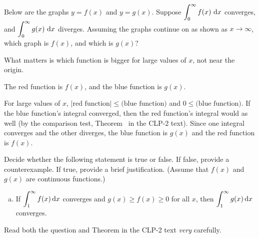 \begin{Mquestion}
Below are the graphs $y=f(x)$ and $y=g(x)$. Suppose $\displaystyle\int_0^\infty f(x)~\mathrm{d}x$ converges, and $\displaystyle\int_0^\infty g(x)~\mathrm{d}x$ diverges. Assuming the graphs continue on as shown as $x \to \infty$, which graph is $f(x)$, and which is $g(x)$?
\begin{center}
\end{center}

\end{Mquestion}
\begin{hint}
What matters is which function is bigger for large values of $x$, not  near the origin.
\end{hint}
\begin{answer}
The red function is $f(x)$, and the blue function is $g(x)$.
\end{answer}
\begin{solution}
For large values of $x$, $|\text{red function}|\leq \text{(blue function)}$ and $0 \leq \text{(blue function)}$. If the blue function's integral converged, then the red function's integral would as well (by the comparison test, Theorem~ in the CLP-2 text). Since one integral converges and the other diverges, the blue function is $g(x)$ and the red function is $f(x)$.
\end{solution}
\begin{question}[2015A]
Decide whether the following statement is true or false.
If false, provide a counterexample. If true, provide a brief justification.
(Assume that $f(x)$ and $g(x)$ are continuous functions.)

\begin{enumerate}[(a)]
\item []
If $\displaystyle\int_{1}^{\infty} f(x) \,\mathrm{d}x$ converges and $g(x)\ge f(x)\ge 0$ for all $x$, then $\displaystyle\int_{1}^{\infty} g(x) \,\mathrm{d}x$ converges.
\end{enumerate}
\end{question}

\begin{hint}
Read both the question and Theorem  in the
CLP-2 text \emph{very} carefully.
\end{hint}

